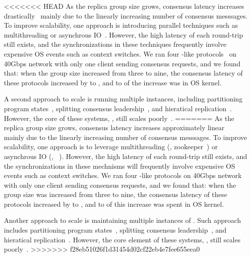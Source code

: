 <<<<<<< HEAD
As the replica group size grows, \paxos consensus latency increases 
drastically~\cite{scatter:sosp11} mainly due to the linearly 
increasing number of consensus messsages. To improve scalability, 
one approach is introducing parallel techniques such as multithreading or 
asynchrous IO~\cite{zookeeper, crane:sosp15}. However, the high latency of each 
round-trip still exists, and the synchronizations in these techniques 
frequently involve expensive OS events such as context switches. We ran four 
\paxos-like protocols~\cite{zookeeper, crane:sosp15, spaxos, libpaxos} on 40Gbps 
network with only one client sending consensus requests, and we found that: when 
the group size increased from three to nine, the consensus latency of these 
protocols increased by \tradlatencyincreaselow to \tradlatencyincreasehigh, and 
\systemcostlow to \systemcosthigh of the increase was in OS kernel. 

A second approach to scale \paxos is running multiple \paxos instances, 
including partitioning program states~\cite{scatter:sosp11,dssmr,ssmr}, 
splitting consensus leadership~\cite{mencius:osdi08,spaxos}, and hieratical 
replication~\cite{manos:hotdep10,scatter:sosp11}. However, the core of 
these systems, \paxos, still 
scales poorly~\cite{ellis:thesis,scatter:sosp11,manos:hotdep10}.
=======
As the replica group size grows, \paxos consensus latency increases
approximately linear~\cite{scatter:sosp11} mainly due to the linearly
increasing number of consensus messsages. To improve scalability, one approach
is to leverage multithreading (\eg, zookeeper~\cite{zookeeper}) or asynchrous
IO (\eg, \crane~\cite{crane:sosp15}). However, the high latency of each
round-trip still exists, and the synchronizations in these mechnisms will
frequently involve expensive OS events such as context switches. We ran four
\paxos-like protocols on 40Gbps network with only one client sending consensus
requests, and we found that: when the group size was increased from three to
nine, the consensus latency of these protocols increased by
\tradlatencyincreaselow to \tradlatencyincreasehigh, and \systemcostlow to
\systemcosthigh of this increase was spent in OS kernel.

Another approach to scale \paxos is maintaining multiple instances of \paxos.
Such approach includes partitioning program
states~\cite{scatter:sosp11,dssmr,ssmr}, splitting consensus
leadership~\cite{mencius:osdi08,spaxos}, and hieratical
replication~\cite{manos:hotdep10,scatter:sosp11}. However, the core element of
these systems, \paxos, still scales
poorly~\cite{ellis:thesis,scatter:sosp11,manos:hotdep10}.
>>>>>>> f28eb51026f1d31454d02cf22eb4e7fee655eea0

